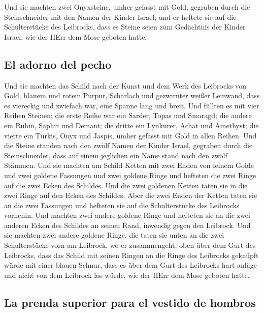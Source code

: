  Und sie machten zwei Onyxsteine, umher gefasst mit Gold,
gegraben durch die Steinschneider mit den Namen der Kinder Israel;
 und er heftete sie auf die Schulterstücke des Leibrocks,
dass es Steine seien zum Gedächtnis der Kinder Israel, wie der HErr dem
Mose geboten hatte.

\hypertarget{el-adorno-del-pecho}{%
\subsection{El adorno del pecho}\label{el-adorno-del-pecho}}

 Und sie machten das Schild nach der Kunst und dem Werk
des Leibrocks von Gold, blauem und rotem Purpur, Scharlach und
gezwirnter weißer Leinwand,  dass es viereckig und
zwiefach war, eine Spanne lang und breit.  Und füllten es
mit vier Reihen Steinen: die erste Reihe war ein Sarder, Topas und
Smaragd;  die andere ein Rubin, Saphir und Demant;
 die dritte ein Lynkurer, Achat und Amethyst;
 die vierte ein Türkis, Onyx und Jaspis, umher gefasst
mit Gold in allen Reihen.  Und die Steine standen nach
den zwölf Namen der Kinder Israel, gegraben durch die Steinschneider,
dass auf einem jeglichen ein Name stand nach den zwölf Stämmen.
 Und sie machten am Schild Ketten mit zwei Enden von
feinem Golde  und zwei goldene Fassungen und zwei goldene
Ringe und hefteten die zwei Ringe auf die zwei Ecken des Schildes.
 Und die zwei goldenen Ketten taten sie in die zwei Ringe
auf den Ecken des Schildes.  Aber die zwei Enden der
Ketten taten sie an die zwei Fassungen und hefteten sie auf die
Schulterstücke des Leibrocks vornehin.  Und machten zwei
andere goldene Ringe und hefteten sie an die zwei anderen Ecken des
Schildes an seinen Rand, inwendig gegen den Leibrock. 
Und sie machten zwei andere goldene Ringe, die taten sie unten an die
zwei Schulterstücke vorn am Leibrock, wo er zusammengeht, oben über dem
Gurt des Leibrocks,  dass das Schild mit seinen Ringen an
die Ringe des Leibrocks geknüpft würde mit einer blauen Schnur, dass es
über dem Gurt des Leibrocks hart anläge und nicht von dem Leibrock los
würde, wie der HErr dem Mose geboten hatte.

\hypertarget{la-prenda-superior-para-el-vestido-de-hombros-1}{%
\subsection{La prenda superior para el vestido de
hombros}\label{la-prenda-superior-para-el-vestido-de-hombros-1}}

